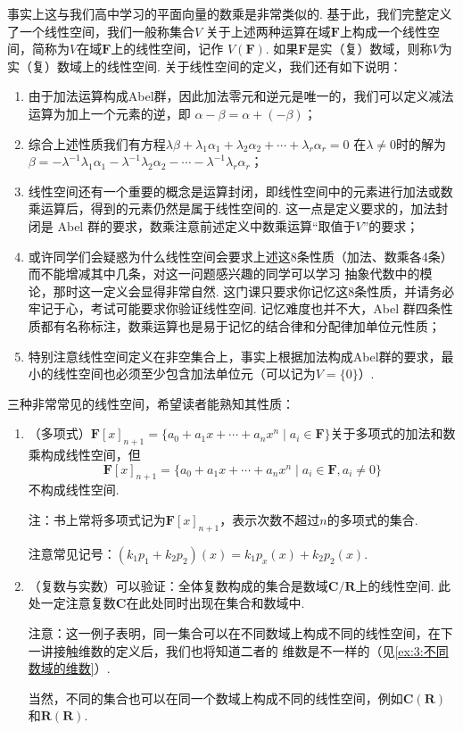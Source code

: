 事实上这与我们高中学习的平面向量的数乘是非常类似的. 基于此，我们完整定义了一个线性空间，我们一般称集合$V$
关于上述两种运算在域$\mathbf{F}$上构成一个线性空间，简称为$V$在域$\mathbf{F}$上的线性空间，记作
$V(\mathbf{F})$. 如果$\mathbf{F}$是实（复）数域，则称$V$为实（复）数域上的线性空间.
关于线性空间的定义，我们还有如下说明：
\begin{enumerate}
    \item 由于加法运算构成Abel群，因此加法零元和逆元是唯一的，我们可以定义减法运算为加上一个元素的逆，即
    $\alpha-\beta=\alpha+(-\beta)$；
    \item 综合上述性质我们有方程$\lambda\beta+\lambda_1\alpha_1+\lambda_2\alpha_2+\cdots+\lambda_r\alpha_r=0$
    在$\lambda\neq 0$时的解为$\beta=-\lambda^{-1}\lambda_1\alpha_1-\lambda^{-1}\lambda_2\alpha_2-\cdots-\lambda^{-1}\lambda_r\alpha_r$；
    \item 线性空间还有一个重要的概念是运算封闭，即线性空间中的元素进行加法或数乘运算后，得到的元素仍然是属于线性空间的.
    这一点是定义要求的，加法封闭是 Abel 群的要求，数乘注意前述定义中数乘运算``取值于$V$''的要求；
    \item 或许同学们会疑惑为什么线性空间会要求上述这8条性质（加法、数乘各4条）而不能增减其中几条，对这一问题感兴趣的同学可以学习
    抽象代数中的模论，那时这一定义会显得非常自然. 这门课只要求你记忆这8条性质，并请务必牢记于心，考试可能要求你验证线性空间.
    记忆难度也并不大，Abel 群四条性质都有名称标注，数乘运算也是易于记忆的结合律和分配律加单位元性质；
    \item 特别注意线性空间定义在非空集合上，事实上根据加法构成Abel群的要求，最小的线性空间也必须至少包含加法单位元（可以记为$V=\{0\}$）.
\end{enumerate}

\begin{example}
    三种非常常见的线性空间，希望读者能熟知其性质：
    \begin{enumerate}
        \item （多项式）$\mathbf{F}[x]_{n+1}=\{a_0+a_1x+\cdots+a_nx^n \mid a_i\in\mathbf{F}\}$关于多项式的加法和数乘构成线性空间，但
        \[\mathbf{F}[x]_{n+1}=\{a_0+a_1x+\cdots+a_nx^n \mid a_i\in\mathbf{F},a_i\neq 0\}\]
        不构成线性空间.

        注：书上常将多项式记为$\mathbf{F}[x]_{n+1}$，表示次数不超过$n$的多项式的集合.

        注意常见记号：$(k_1p_1+k_2p_2)(x)=k_1p_x(x)+k_2p_2(x)$.
        \item （复数与实数）可以验证：全体复数构成的集合是数域$\mathbf{C}/\mathbf{R}$上的线性空间. 此处一定注意复数$\mathbf{C}$在此处同时出现在集合和数域中.

        注意：这一例子表明，同一集合可以在不同数域上构成不同的线性空间，在下一讲接触维数的定义后，我们也将知道二者的
        维数是不一样的（见\autoref{ex:3:不同数域的维数}）.

        当然，不同的集合也可以在同一个数域上构成不同的线性空间，例如$\mathbf{C(R)}$和$\mathbf{R(R)}$.
    \end{enumerate}
\end{example}

